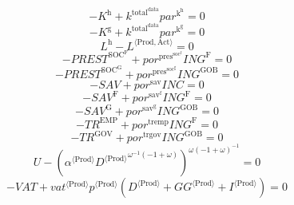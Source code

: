 \begin{equation}
-K^{\mathrm{h}} + {k^{\mathrm{total}^{\mathrm{data}}}} {{p\!a\!r}^{\mathrm{k}^{\mathrm{h}}}} = 0
\end{equation}
\begin{equation}
-K^{\mathrm{g}} + {k^{\mathrm{total}^{\mathrm{data}}}} {{p\!a\!r}^{\mathrm{k}^{\mathrm{g}}}} = 0
\end{equation}
\begin{equation}
L^{\mathrm{h}} - {L}^{\langle \mathrm{Prod},\mathrm{Act}\rangle} = 0
\end{equation}
\begin{equation}
-{P\!R\!E\!S\!T}^{\mathrm{SOC}^{\mathrm{F}}} + {{p\!o\!r}^{\mathrm{pres}^{\mathrm{soc}^{\mathrm{f}}}}} {{I\!N\!G}^{\mathrm{F}}} = 0
\end{equation}
\begin{equation}
-{P\!R\!E\!S\!T}^{\mathrm{SOC}^{\mathrm{G}}} + {{p\!o\!r}^{\mathrm{pres}^{\mathrm{soc}^{\mathrm{g}}}}} {{I\!N\!G}^{\mathrm{GOB}}} = 0
\end{equation}
\begin{equation}
-{S\!A\!V} + {{p\!o\!r}^{\mathrm{sav}}} {{I\!N\!C}} = 0
\end{equation}
\begin{equation}
-{S\!A\!V}^{\mathrm{F}} + {{p\!o\!r}^{\mathrm{sav}^{\mathrm{f}}}} {{I\!N\!G}^{\mathrm{F}}} = 0
\end{equation}
\begin{equation}
-{S\!A\!V}^{\mathrm{G}} + {{p\!o\!r}^{\mathrm{sav}^{\mathrm{g}}}} {{I\!N\!G}^{\mathrm{GOB}}} = 0
\end{equation}
\begin{equation}
-{T\!R}^{\mathrm{EMP}} + {{p\!o\!r}^{\mathrm{tremp}}} {{I\!N\!G}^{\mathrm{F}}} = 0
\end{equation}
\begin{equation}
-{T\!R}^{\mathrm{GOV}} + {{p\!o\!r}^{\mathrm{trgov}}} {{I\!N\!G}^{\mathrm{GOB}}} = 0
\end{equation}
\begin{equation}
U - \left({{\alpha}^{\langle \mathrm{\mathrm{Prod}}\rangle}} {{{D}^{\langle \mathrm{Prod}\rangle}}^{{\omega}^{-1} \left(-1 + \omega\right)}}\right)^{{\omega} \left(-1 + \omega\right)^{-1}} = 0
\end{equation}
\begin{equation}
-{V\!A\!T} + {{{v\!a\!t}}^{\langle \mathrm{\mathrm{Prod}}\rangle}} {{p}^{\langle \mathrm{Prod}\rangle}} \left({D}^{\langle \mathrm{Prod}\rangle} + {{G\!G}}^{\langle \mathrm{Prod}\rangle} + {I}^{\langle \mathrm{Prod}\rangle}\right) = 0
\end{equation}
